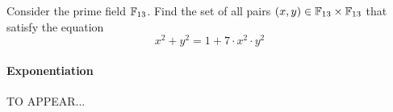 \begin{exercise} Consider the prime field $\mathbb{F}_{13}$. Find the set of all pairs $(x,y)\in \mathbb{F}_{13}\times \mathbb{F}_{13}$ that satisfy the equation
$$
x^2+y^2 = 1 + 7\cdot x^2\cdot y^2
$$
\end{exercise}
%


\paragraph{Exponentiation} TO APPEAR...
